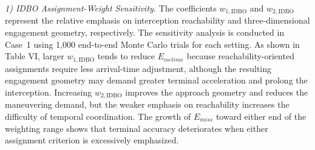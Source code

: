 \documentclass[11pt]{article}
\newcommand{\hladd}[1]{{\color{addblue}#1}}
\begin{document}
\begin{tcolorbox}[enhanced,breakable,colback=white,colframe=addblue!55,
coltext=addblue,fontupper=\color{addblue},boxrule=0.6pt,arc=2pt,
left=9pt,right=9pt,top=7pt,bottom=7pt]
\hladd{\emph{1) IDBO Assignment-Weight Sensitivity.}
The coefficients $w_{1,\mathrm{IDBO}}$ and $w_{2,\mathrm{IDBO}}$ represent
the relative emphasis on interception reachability and three-dimensional
engagement geometry, respectively. The sensitivity analysis is conducted in
Case~1 using 1,000 end-to-end Monte Carlo trials for each setting. As shown
in Table VI, larger $w_{1,\mathrm{IDBO}}$ tends
to reduce $E_{co\text{-}time}$ because reachability-oriented assignments
require less arrival-time adjustment, although the resulting engagement
geometry may demand greater terminal acceleration and prolong the
interception. Increasing $w_{2,\mathrm{IDBO}}$ improves the approach
geometry and reduces the maneuvering demand, but the weaker emphasis on
reachability increases the difficulty of temporal coordination. The growth
of $E_{miss}$ toward either end of the weighting range shows that terminal
accuracy deteriorates when either assignment criterion is excessively
emphasized.}


\end{tcolorbox}
\end{document}
